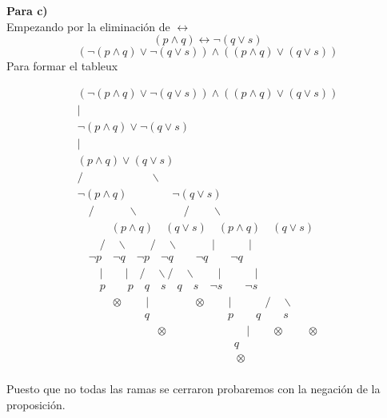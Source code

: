 \textbf{Para c)}\\
Empezando por la eliminación de $\leftrightarrow$\\
\[
(p \land q) \leftrightarrow \neg(q \lor s)
\]
\[
(\neg(p \land q) \lor \neg (q \lor s))\land ((p \land q) \lor (q \lor s))
\]
Para formar el tableux
\begin{center}
\[
\begin{array}{c}
(\neg(p \land q) \lor \neg (q \lor s))\land ((p \land q) \lor (q \lor s))\\
| \\
\neg(p \land q) \lor \neg (q \lor s) \\
| \\
(p \land q) \lor (q \lor s) \\
/ \quad \quad \quad \quad \quad \quad \backslash \\
\neg (p \land q) \quad \quad \quad \quad \neg (q \lor s) \\
\quad / \quad \quad \quad  \backslash \quad \quad \quad \quad / \quad \quad  \backslash \\
\quad \quad \quad (p \land q) \quad (q\lor s) \quad  (p \land q) \quad (q \lor s) \\
\quad \quad / \quad \backslash \quad \quad / \quad \backslash \quad  \quad \quad | \quad \quad \quad | \\
\quad \neg p \quad \neg q \quad \neg p \quad \neg q \quad \quad \neg q \quad \quad \neg q \\
 \quad \quad   | \quad  \quad | \quad / \quad \backslash / \quad \backslash \quad \quad | \quad \quad \quad |\\
 \quad \quad p \quad \quad  p \quad q \quad s \quad q \quad s \quad \neg s \quad
 \quad \neg s \\
\quad \quad  \quad  \otimes \quad \quad | \quad \quad \quad \quad  \otimes \quad \quad | \quad \quad \quad / \quad \backslash \\
\quad \quad \quad \quad \quad \quad q \quad \quad \quad \quad \quad  \quad \quad  p \quad \quad q \quad \quad s \\
\quad \quad \quad \quad \quad \quad \quad \otimes \quad \quad \quad \quad \quad  \quad \quad  | \quad \quad \otimes \quad \quad \otimes \\
\quad \quad \quad \quad \quad \quad \quad  \quad \quad \quad \quad \quad  \quad \quad  q \quad \quad \quad  \quad \quad \\\
 \quad \quad \quad \quad \quad \quad \quad  \quad \quad \quad \quad \quad  \quad \quad  \otimes \quad \quad \quad  \quad \quad \\
\end{array}
\]
\end{center}
Puesto que no todas las ramas se cerraron probaremos con la negación de la proposición.

